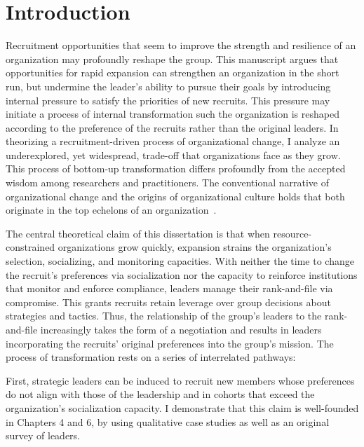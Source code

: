 \chapter{Introduction}


Recruitment opportunities that seem to improve the strength and resilience of an organization may profoundly reshape the group.  This manuscript argues that opportunities for rapid expansion can strengthen an organization in the short run, but undermine the leader's ability to pursue their goals by introducing internal pressure to satisfy the priorities of new recruits. This pressure may initiate a process of internal transformation such the organization is reshaped according to the preference of the recruits rather than the original leaders. In theorizing a recruitment-driven process of organizational change, I analyze an underexplored, yet widespread, trade-off that organizations face as they grow.  This process of bottom-up transformation differs profoundly from the accepted wisdom among researchers and practitioners. The conventional narrative of organizational change and the origins of organizational culture holds that both originate in the top echelons of an organization~\autocite{hambrick1984upper, schein1990organizational}.

The central theoretical claim of this dissertation is that when resource-constrained organizations grow quickly, expansion strains the organization's selection, socializing, and monitoring capacities.  With neither the time to change the recruit's preferences via socialization nor the capacity to reinforce institutions that monitor and enforce compliance, leaders manage their rank-and-file via compromise. This grants recruits retain leverage over group decisions about strategies and tactics.  Thus, the relationship of the group's leaders to the rank-and-file increasingly takes the form of a negotiation and results in leaders incorporating the recruits' original preferences into the group's mission. The process of transformation rests on a series of interrelated pathways:

First, strategic leaders can be induced to recruit new members whose preferences do not align with those of the leadership and in cohorts that exceed the organization's socialization capacity. I demonstrate that this claim is well-founded in Chapters 4 and 6, by using qualitative case studies as well as an original survey of leaders. 

